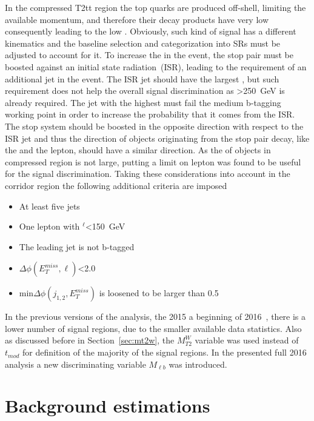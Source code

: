 In the compressed T2tt region the top quarks are produced off-shell, limiting the available momentum,  and therefore their decay products have very low \pt consequently leading to the low \MET. Obviously, such kind of signal has a different kinematics and the baseline selection and categorization into SRs must be adjusted to account for it. To increase the \MET in the event, the stop pair must be boosted against an initial state radiation~(ISR), leading to the requirement of  an additional jet in the event. The ISR jet should have the largest \pt, but such requirement does not help the overall signal discrimination as \MET>250~GeV is already required. The jet with the highest \pt must fail the medium b-tagging working point in order to increase the probability that it comes from the ISR. The stop system should be boosted in the opposite direction with respect to the ISR jet and thus the direction of objects originating from the stop pair decay, like the \MET and the lepton, should have a similar direction. As the \pt of objects in compressed region is not large, putting a limit on lepton \pt was found to be useful for the signal discrimination. Taking these considerations into account in the corridor region the following additional criteria are imposed

\begin{itemize}
\item At least five jets
\item One lepton with \pt$^{\ell}$<150~GeV
\item The leading jet is not b-tagged
\item $\Delta \phi(E_{T}^{miss}, \ell)$<2.0 
\item min$\Delta \phi (j_{1,2}, E_{T}^{miss})$ is loosened to be larger than  0.5
\end{itemize}

In the previous versions of the analysis, the 2015 a beginning of 2016~\cite{Sirunyan:2016jpr, CMS:2016vew}, there is a lower number of signal regions, due to the smaller available data statistics. Also as discussed before in Section~\ref{sec:mt2w}, the $M_{T2}^{W}$ variable was used instead of $t_{mod}$ for definition of the majority of the signal regions. In the presented full 2016 analysis a new discriminating variable $M_{\ell b}$ was introduced. %


\section{Background estimations~\label{sec:estimations}}

